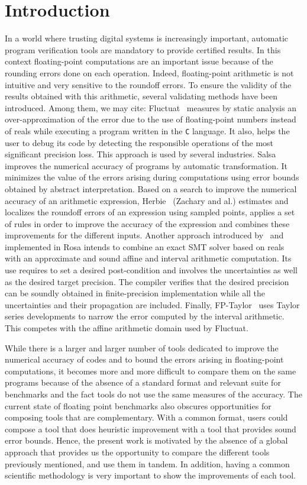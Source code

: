 \documentclass[main.tex]{subfiles}
\begin{document}
\section{Introduction}
\label{sec:intro}

In a world where trusting digital systems is increasingly important,
automatic program verification tools are mandatory to provide
certified results.  In this context floating-point computations are an
important issue because of the rounding errors done on each operation.
Indeed, floating-point arithmetic is not intuitive and very sensitive
to the roundoff errors.  To ensure the validity of the results
obtained with this arithmetic, several validating methods have been
introduced.  Among them, we may cite: Fluctuat~\cite{Goubault13,GMP06}
measures by static analysis an over-approximation of the error due to
the use of floating-point numbers instead of reals while executing a
program written in the \texttt{C} language.  It also, helps the user
to debug its code by detecting the responsible operations of the most
significant precision loss.  This approach is used by several
industries.  Salsa~\cite{fmics15} improves the numerical accuracy of
programs by automatic transformation.  It minimizes the value of the
errors arising during computations using error bounds obtained by
abstract interpretation.  Based on a search to improve the numerical
accuracy of an arithmetic expression, Herbie~\cite{pavel15} (Zachary
and al.) estimates and localizes the roundoff errors of an expression
using sampled points, applies a set of rules in order to improve the
accuracy of the expression and combines these improvements for the
different inputs.  Another approach introduced by~\cite{DarulovaK14}
and implemented in Rosa intends to combine an exact SMT solver based
on reals with an approximate and sound affine and interval arithmetic
computation.  Its use requires to set a desired post-condition and
involves the uncertainties as well as the desired target precision.
The compiler verifies that the desired precision can be soundly
obtained in finite-precision implementation while all the
uncertainties and their propagation are included.  Finally,
FP-Taylor~\cite{fptaylor-fm15} uses Taylor series developments to
narrow the error computed by the interval arithmetic.  This competes
with the affine arithmetic domain used by Fluctuat.


While there is a larger and larger number of tools dedicated to
improve the numerical accuracy of codes and to bound the errors
arising in floating-point computations, it becomes more and more
difficult to compare them on the same programs because of the absence
of a standard format and relevant suite for benchmarks and the fact
tools do not use the same measures of the accuracy. The current state
of floating point benchmarks also obscures opportunities for composing
tools that are complementary. With a common format, users could
compose a tool that does heuristic improvement with a tool that
provides sound error bounds.  Hence, the present work is motivated by
the absence of a global approach that provides us the opportunity to
compare the different tools previously mentioned, and use them in
tandem. In addition, having a common scientific methodology is very
important to show the improvements of each tool.
\end{document}
